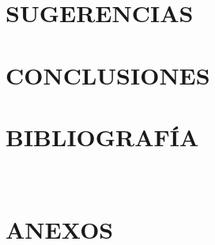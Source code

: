 \documentclass[11pt]{article}
\begin{document}
\section{SUGERENCIAS}




\newpage
\setcounter{equation}{0} %
\setcounter{figure}{0} %
\setcounter{table}{0} %
\section{CONCLUSIONES}






\newpage
\setcounter{equation}{0} %
\setcounter{figure}{0} %
\setcounter{table}{0} %
\section{BIBLIOGRAFÍA}
 
 
\

\newpage
\pagestyle{empty} %
\setcounter{equation}{0} %
\setcounter{figure}{0} %
\setcounter{table}{0} %
\renewcommand{\thesubsection}{APÉNDICE \Alph{subsection}:}                            %
\renewcommand{\thesubsubsection}{\Alph{subsection}.\arabic{subsubsection}:}       %
\renewcommand{\theequation}{.\Alph{subsection}\arabic{equation}} %
\renewcommand{\thefigure}{\Alph{subsection}.\arabic{figure}} %
\renewcommand{\thetable}{\Alph{subsection}.\arabic{table}} %

\section*{ANEXOS}


\end{document}
